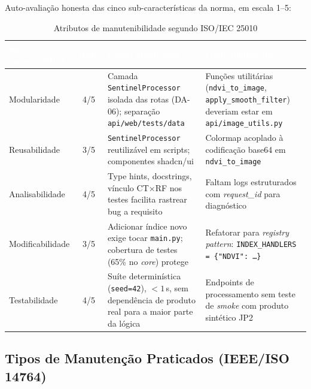 \documentclass[11pt, a4paper]{article}
\begin{document}
Auto-avaliação honesta das cinco sub-características da norma, em escala 1--5:

\renewcommand{\arraystretch}{1.4}
\begin{table}[H]
\centering
\small
{}
\begin{tabularx}{\textwidth}{@{}lcXX@{}}
\toprule
\rowcolor{tabheader}\textcolor{white}{\textbf{Sub-característica}} & \textcolor{white}{\textbf{Nota}} & \textcolor{white}{\textbf{Como atendemos}} & \textcolor{white}{\textbf{Onde melhoraria}}\\
\midrule
Modularidade     & 4/5 & Camada \texttt{SentinelProcessor} isolada das rotas (DA-06); separação \texttt{api/web/tests/data} & Funções utilitárias (\texttt{ndvi\_to\_image}, \texttt{apply\_smooth\_filter}) deveriam estar em \texttt{api/image\_utils.py}\\
Reusabilidade    & 3/5 & \texttt{SentinelProcessor} reutilizável em scripts; componentes shadcn/ui & Colormap acoplado à codificação base64 em \texttt{ndvi\_to\_image}\\
Analisabilidade  & 4/5 & Type hints, docstrings, vínculo CT$\times$RF nos testes facilita rastrear bug a requisito & Faltam logs estruturados com \textit{request\_id} para diagnóstico\\
Modificabilidade & 3/5 & Adicionar índice novo exige tocar \texttt{main.py}; cobertura de testes (65\% no \textit{core}) protege & Refatorar para \textit{registry pattern}: \texttt{INDEX\_HANDLERS = \{"NDVI": \dots\}}\\
Testabilidade    & 4/5 & Suíte determinística (\texttt{seed=42}), \(<1\)\,s, sem dependência de produto real para a maior parte da lógica & Endpoints de processamento sem teste de \textit{smoke} com produto sintético JP2\\
\bottomrule
\end{tabularx}
\caption{Atributos de manutenibilidade segundo ISO/IEC 25010}
\end{table}

\subsection{Tipos de Manutenção Praticados (IEEE/ISO 14764)}
\end{document}
